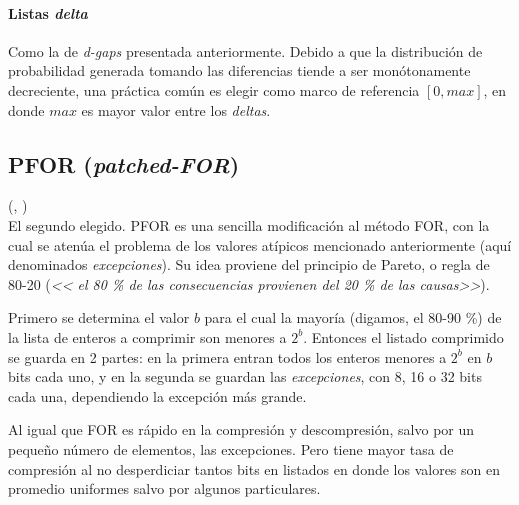 




\paragraph{Listas \textit{delta}}Como la de \textit{d-gaps} presentada anteriormente. Debido a que la distribución de probabilidad generada tomando las diferencias tiende a ser monótonamente decreciente, una práctica común es elegir como marco de referencia $[0, max]$, en donde $max$ es mayor valor entre los \textit{deltas}. 


\subsection{PFOR (\textit{patched-FOR})}

(\noindent \citeauthor{Zukowski:2006}, \citeyear{Zukowski:2006})
\\

El segundo elegido. PFOR es una sencilla modificación al método FOR, con la cual se atenúa el problema de los valores atípicos mencionado anteriormente (aquí denominados \textit{excepciones}). Su idea proviene del principio de Pareto, o regla de 80-20 (\textit{<< el 80 \% de las consecuencias provienen del 20 \% de las causas>>}).

Primero se determina el valor $b$ para el cual la mayoría (digamos, el 80-90 \%) de la lista de enteros a comprimir son menores a $2^b$. Entonces el listado comprimido se guarda en 2 partes: en la primera entran todos los enteros menores a $2^b$ en $b$ bits cada uno, y en la segunda se guardan las \textit{excepciones}, con 8, 16 o 32 bits cada una, dependiendo la excepción más grande.

Al igual que FOR es rápido en la compresión y descompresión, salvo por un pequeño número de elementos, las excepciones. Pero tiene mayor tasa de compresión al no desperdiciar tantos bits en listados en donde los valores son en promedio uniformes salvo por algunos particulares.

